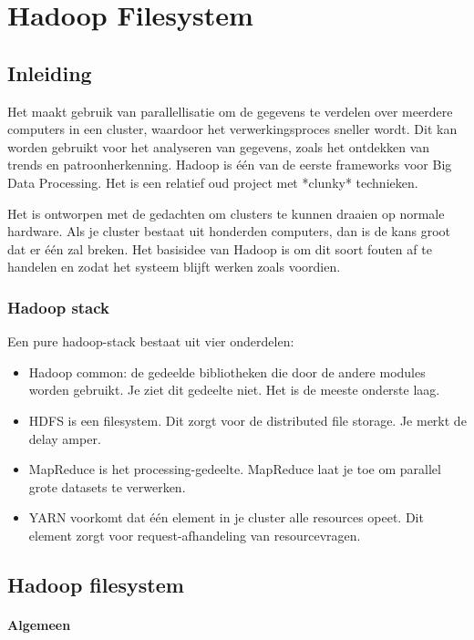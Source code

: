 \documentclass[a4paper,10pt,twoside]{report}
\begin{document}
\chapter{Hadoop Filesystem}

\section{Inleiding}

Het maakt gebruik van parallellisatie om de gegevens te verdelen over meerdere computers in een cluster, waardoor het verwerkingsproces sneller wordt. Dit kan worden gebruikt voor het analyseren van gegevens, zoals het ontdekken van trends en patroonherkenning. Hadoop is één van de eerste frameworks voor Big Data Processing. Het is een relatief oud project met *clunky* technieken. 

Het is ontworpen met de gedachten om clusters te kunnen draaien op normale hardware. Als je cluster bestaat uit honderden computers, dan is de kans groot dat er één zal breken. Het basisidee van Hadoop is om dit soort fouten af te handelen en zodat het systeem blijft werken zoals voordien.

\subsection{Hadoop stack}

Een pure hadoop-stack bestaat uit vier onderdelen:

\begin{itemize}
	\item Hadoop common: de gedeelde bibliotheken die door de andere modules worden gebruikt. Je ziet dit gedeelte niet. Het is de meeste onderste laag.
	\item HDFS is een filesystem. Dit zorgt voor de distributed file storage. Je merkt de delay amper.
	\item MapReduce is het processing-gedeelte. MapReduce laat je toe om parallel grote datasets te verwerken.
	\item YARN voorkomt dat één element in je cluster alle resources opeet. Dit element zorgt voor request-afhandeling van resourcevragen.
\end{itemize}

\section{Hadoop filesystem}

\subsubsection{Algemeen}
\end{document}
